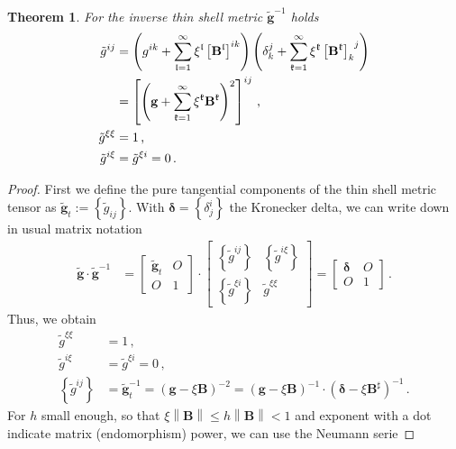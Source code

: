 \documentclass[a4paper,11pt]{scrartcl}
\newcommand{\gb}{\mathbf{g}}
\newcommand{\tgb}{\tilde{\gb}}
\newcommand{\tg}{\tilde{g}}
\newcommand{\Bb}{\mathbf{B}}
\newcommand{\deltab}{\bm{\delta}}
\newcommand{\frakk}{\mathfrak{k}}
\newcommand{\frakl}{\mathfrak{l}}
\newcommand{\formComma}{\,\text{,}}
\newcommand{\formPeriod}{\,\text{.}}
\newtheorem{theorem}{Theorem}
\begin{document}
\begin{theorem}
  For the inverse thin shell metric \( \tgb^{-1} \) holds
  \begin{align}
    \tg^{ij} &= \left( g^{ik} + \sum_{\frakl = 1}^{\infty} \xi^{\frakl}\left[ \Bb^{\frakl} \right]^{ik} \right)
               \left( \delta_{k}^{j} + \sum_{\frakk = 1}^{\infty} \xi^{\frakk}\tensor{\left[ \Bb^{\frakk} \right]}{_{k}^{j}} \right) \\
             &= \left[\left( \gb + \sum_{\frakk = 1}^{\infty} \xi^{\frakk} \Bb^{\frakk} \right)^{2}\right]^{ij}\formComma\\
    \tg^{\xi\xi} &= 1 \formComma\\
    \tg^{i\xi} &= \tg^{\xi i} = 0 \formPeriod
  \end{align}
\end{theorem}
\begin{proof}
  First we define the pure tangential components of the thin shell metric tensor as \( \tgb_{t} := \left\{ \tg_{ij} \right\} \).
  With \( \deltab = \left\{ \delta^{i}_{j} \right\} \) the Kronecker delta, we can write down in usual matrix notation
  \begin{align}
    \tgb\cdot\tgb^{-1} &=
      \begin{bmatrix}
        \tgb_{t} & O \\
          O      & 1
      \end{bmatrix}
      \cdot
      \begin{bmatrix}
         \left\{ \tg^{ij} \right\} & \left\{ \tg^{i\xi} \right\} \\
         \left\{ \tg^{\xi i} \right\} & \tg^{\xi\xi}
      \end{bmatrix}
          =
             \begin{bmatrix}
                \deltab & O \\
                O       & 1
             \end{bmatrix} \formPeriod
  \end{align}
  Thus, we obtain
  \begin{align}
    \tg^{\xi\xi} &= 1 \formComma\\
    \tg^{i\xi} &= \tg^{\xi i} = 0 \formComma\\
    \left\{ \tg^{ij} \right\} &= \tgb_{t}^{-1}
                         =\left( \gb - \xi\Bb \right)^{-2}
                         = \left( \gb - \xi\Bb \right)^{-1} \cdot \left( \deltab - \xi\Bb^{\sharp} \right)^{-1}\formPeriod
  \end{align}
  For \( h \) small enough, so that \( \xi\left\| \Bb \right\| \le h\left\| \Bb \right\| < 1 \) and exponent with a dot indicate matrix (endomorphism) power, we can use the Neumann serie 

\end{proof}
\end{document}
